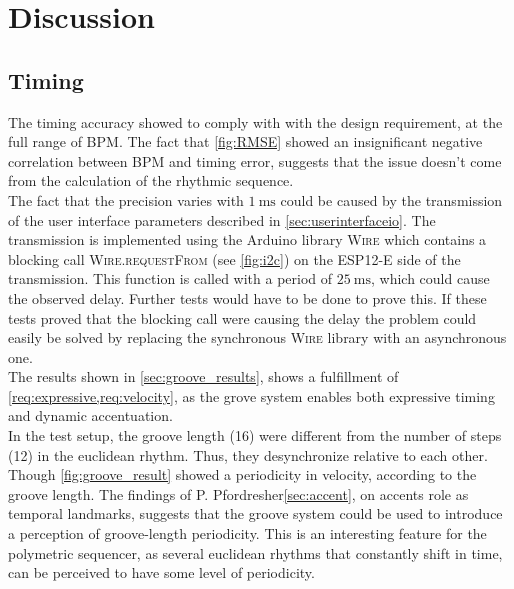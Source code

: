 \chapter{Discussion}
\section{Timing}

The timing accuracy showed to comply with with the design requirement, at the full range of BPM.
The fact that \cref{fig:RMSE} showed an insignificant negative correlation between BPM and timing error, suggests that the issue doesn't come from the calculation of the rhythmic sequence.\\ 
The fact that the precision varies with $\SI{1}{\milli\second}$ could be caused by the transmission of the user interface parameters described in \cref{sec:userinterfaceio}. The transmission is implemented using the Arduino library \textsc{Wire} which contains a blocking call \textsc{Wire.requestFrom} (see \cref{fig:i2c}) on the ESP12-E side of the transmission. This function is called with a period of $\SI{25}{\milli\second}$, which could cause the observed delay. Further tests would have to be done to prove this. If these tests proved that the blocking call were causing the delay the problem could easily be solved by replacing the synchronous \textsc{Wire} library with an asynchronous one.\\

The results shown in \cref{sec:groove_results}, shows a fulfillment of \cref{req:expressive,req:velocity}, as the grove system enables both expressive timing and dynamic accentuation.\\ In the test setup, the groove length (16) were different from the number of steps (12) in the euclidean rhythm. Thus, they desynchronize relative to each other. Though \cref{fig:groove_result} showed a periodicity in velocity, according to the groove length. The findings of P. Pfordresher\cref{sec:accent}, on accents role as temporal landmarks, suggests that the groove system could be used to introduce a perception of groove-length periodicity. This is an interesting feature for the polymetric sequencer, as several euclidean rhythms that constantly shift in time, can be perceived to have some level of periodicity.\\ 


